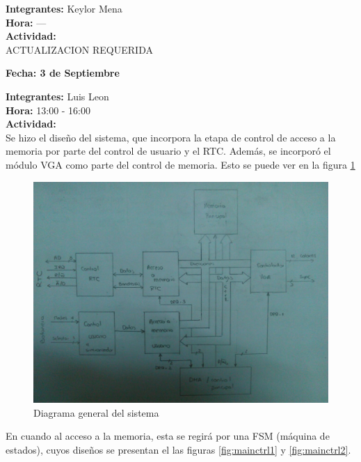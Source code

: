 \documentclass[12pt,a4paper]{report}
\begin{document}
\noindent \textbf{Integrantes:} Keylor Mena \\[1ex]
\textbf{Hora:} ---\\[1ex]
\textbf{Actividad:} \\[2ex]

ACTUALIZACION REQUERIDA \\[2ex]

\newpage
\begin{flushright}
	\begin{large}
		\textbf{Fecha: 3 de Septiembre}\\[5ex]
	\end{large}
\end{flushright}

\noindent \textbf{Integrantes:} Luis Leon \\[1ex]
\textbf{Hora:} 13:00 - 16:00 \\[1ex]
\textbf{Actividad:} \\[2ex]

Se hizo el diseño del sistema, que incorpora la etapa de control de acceso a la memoria por parte del control de usuario y el RTC. Además, se incorporó el módulo VGA como parte del control de memoria. Esto se puede ver en la figura \ref{fig:sysdesign1} \\

\begin{figure}[hbtp]
	\centering
	\includegraphics[width=16cm]{Img/sysdesign1.jpeg}
	\caption{Diagrama general del sistema}
	\label{fig:sysdesign1}
\end{figure}

En cuando al acceso a la memoria, esta se regirá por una FSM (máquina de estados), cuyos diseños se presentan el las figuras \ref{fig:mainctrl1} y \ref{fig:mainctrl2}.\\
\end{document}
